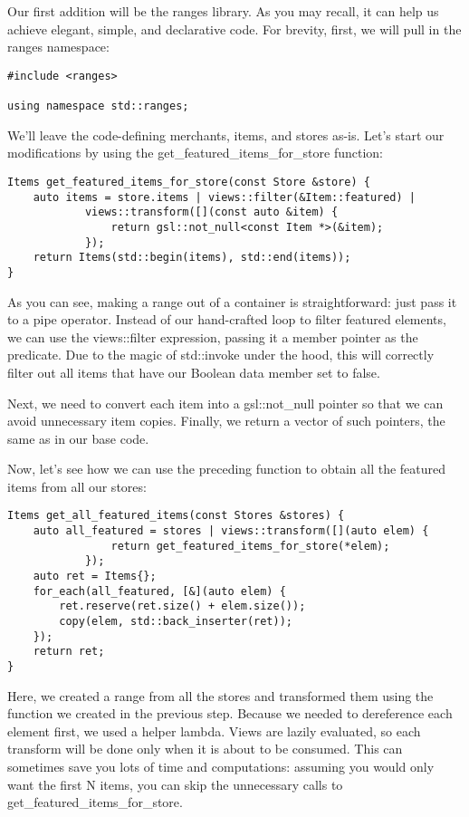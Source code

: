 Our first addition will be the ranges library. As you may recall, it can help us achieve elegant, simple, and declarative code. For brevity, first, we will pull in the ranges namespace:

\begin{lstlisting}[style=styleCXX]
#include <ranges>

using namespace std::ranges;
\end{lstlisting}

We'll leave the code-defining merchants, items, and stores as-is. Let's start our modifications by using the get\_featured\_items\_for\_store function:

\begin{lstlisting}[style=styleCXX]
Items get_featured_items_for_store(const Store &store) {
	auto items = store.items | views::filter(&Item::featured) |
			views::transform([](const auto &item) {
				return gsl::not_null<const Item *>(&item);
			});
	return Items(std::begin(items), std::end(items));
}
\end{lstlisting}

As you can see, making a range out of a container is straightforward: just pass it to a pipe operator. Instead of our hand-crafted loop to filter featured elements, we can use the views::filter expression, passing it a member pointer as the predicate. Due to the magic of std::invoke under the hood, this will correctly filter out all items that have our Boolean data member set to false.

Next, we need to convert each item into a gsl::not\_null pointer so that we can avoid unnecessary item copies. Finally, we return a vector of such pointers, the same as in our base code.

Now, let's see how we can use the preceding function to obtain all the featured items from all our stores:

\begin{lstlisting}[style=styleCXX]
Items get_all_featured_items(const Stores &stores) {
	auto all_featured = stores | views::transform([](auto elem) {
				return get_featured_items_for_store(*elem);
			});
	auto ret = Items{};
	for_each(all_featured, [&](auto elem) {
		ret.reserve(ret.size() + elem.size());
		copy(elem, std::back_inserter(ret));
	});
	return ret;
}
\end{lstlisting}

Here, we created a range from all the stores and transformed them using the function we created in the previous step. Because we needed to dereference each element first, we used a helper lambda. Views are lazily evaluated, so each transform will be done only when it is about to be consumed. This can sometimes save you lots of time and computations: assuming you would only want the first N items, you can skip the unnecessary calls to get\_featured\_items\_for\_store.


